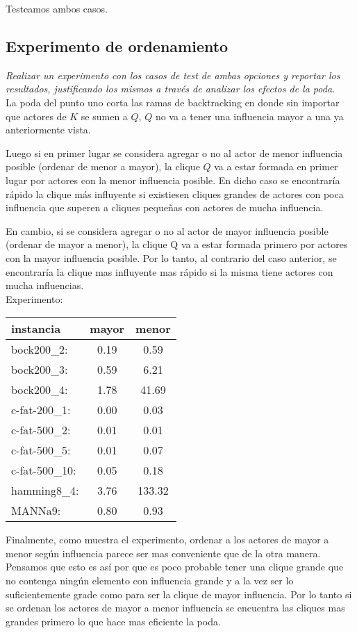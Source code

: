 \documentclass[10pt, a4paper]{article}
\begin{document}
Testeamos ambos casos.

\subsection{Experimento de ordenamiento}
\emph{Realizar un experimento con los casos de test de ambas opciones y reportar los resultados,
justificando los mismos a través de analizar los efectos de la poda.} \\

La poda del punto uno corta las ramas de backtracking en donde sin importar que actores de $K$ se sumen a $Q$, $Q$ no va a tener una influencia mayor a una ya anteriormente vista.

Luego si en primer lugar se considera agregar o no al actor de menor influencia posible (ordenar de menor a mayor), la clique $Q$ va a estar formada en primer lugar por actores con la menor influencia posible. En dicho caso se encontraría rápido la clique más influyente si existiesen cliques grandes de actores con poca influencia que superen a cliques pequeñas con actores de mucha influencia. 

En cambio, si se considera agregar o no al actor de mayor influencia posible (ordenar de mayor a menor), la clique Q va a estar formada primero por actores con la mayor influencia posible. Por lo tanto, al contrario del caso anterior, se encontraría la clique mas influyente mas rápido si la misma tiene actores con mucha influencias.
\\

Experimento:
\\
\begin{center}
\begin{tabular}{l c|c}
instancia & mayor & menor \\
\hline
bock200\_2: & 0.19 & 0.59 \\
bock200\_3: & 0.59 & 6.21 \\
bock200\_4: & 1.78 & 41.69 \\
c-fat-200\_1: & 0.00 & 0.03 \\
c-fat-500\_2: & 0.01 & 0.01 \\
c-fat-500\_5: & 0.01 & 0.07 \\
c-fat-500\_10: & 0.05 & 0.18 \\
hamming8\_4:	& 3.76 & 133.32 \\
MANNa9: & 0.80 & 0.93
\end{tabular}
\end{center}
Finalmente, como muestra el experimento, ordenar a los actores de mayor a menor según influencia parece ser mas conveniente que de la otra manera. Pensamos que esto es así por que es poco probable tener una clique grande que no contenga ningún elemento con influencia grande y a la vez ser lo suficientemente grade como para ser la clique de mayor influencia. Por lo tanto si se ordenan los actores de mayor a menor influencia se encuentra las cliques mas grandes primero lo que hace mas eficiente la poda.
\end{document}
